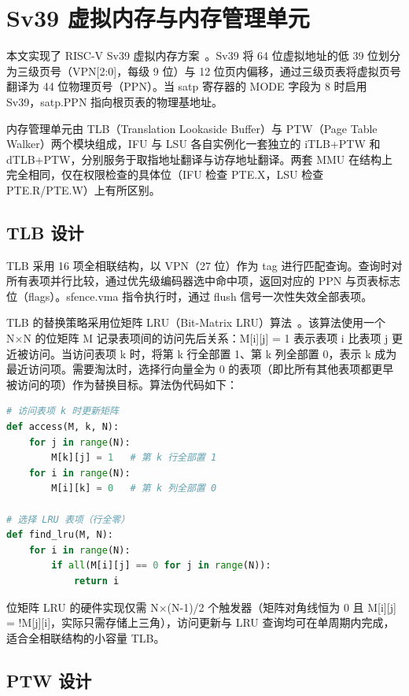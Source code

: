 \section{Sv39 虚拟内存与内存管理单元}

本文实现了 RISC-V Sv39 虚拟内存方案~\cite{riscv2024priv}。Sv39 将 64 位虚拟地址的低 39 位划分为三级页号（VPN[2:0]，每级 9 位）与 12 位页内偏移，通过三级页表将虚拟页号翻译为 44 位物理页号（PPN）。当 satp 寄存器的 MODE 字段为 8 时启用 Sv39，satp.PPN 指向根页表的物理基地址。

内存管理单元由 TLB（Translation Lookaside Buffer）与 PTW（Page Table Walker）两个模块组成，IFU 与 LSU 各自实例化一套独立的 iTLB+PTW 和 dTLB+PTW，分别服务于取指地址翻译与访存地址翻译。两套 MMU 在结构上完全相同，仅在权限检查的具体位（IFU 检查 PTE.X，LSU 检查 PTE.R/PTE.W）上有所区别。

\subsection{TLB 设计}\label{sec:tlb}

TLB 采用 16 项全相联结构，以 VPN（27 位）作为 tag 进行匹配查询。查询时对所有表项并行比较，通过优先级编码器选中命中项，返回对应的 PPN 与页表标志位（flags）。sfence.vma 指令执行时，通过 flush 信号一次性失效全部表项。

TLB 的替换策略采用位矩阵 LRU（Bit-Matrix LRU）算法~\cite{belady1966replacement}。该算法使用一个 N×N 的位矩阵 M 记录表项间的访问先后关系：M[i][j] = 1 表示表项 i 比表项 j 更近被访问。当访问表项 k 时，将第 k 行全部置 1、第 k 列全部置 0，表示 k 成为最近访问项。需要淘汰时，选择行向量全为 0 的表项（即比所有其他表项都更早被访问的项）作为替换目标。算法伪代码如下：

\begin{lstlisting}[language=Python,caption={位矩阵 LRU 替换算法伪代码},label={lst:bit-matrix-lru}]
# 访问表项 k 时更新矩阵
def access(M, k, N):
    for j in range(N):
        M[k][j] = 1   # 第 k 行全部置 1
    for i in range(N):
        M[i][k] = 0   # 第 k 列全部置 0

# 选择 LRU 表项（行全零）
def find_lru(M, N):
    for i in range(N):
        if all(M[i][j] == 0 for j in range(N)):
            return i
\end{lstlisting}

位矩阵 LRU 的硬件实现仅需 N×(N-1)/2 个触发器（矩阵对角线恒为 0 且 M[i][j] = !M[j][i]，实际只需存储上三角），访问更新与 LRU 查询均可在单周期内完成，适合全相联结构的小容量 TLB。

\subsection{PTW 设计}\label{sec:ptw}

